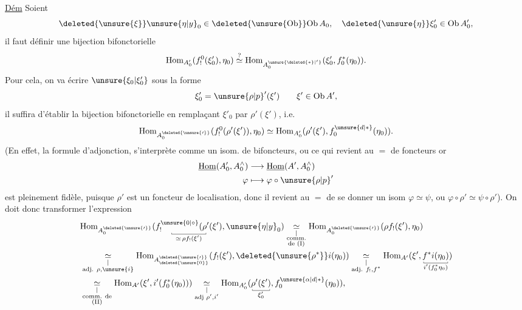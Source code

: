 \uline{Dém} Soient
\[
 \deleted{\unsure{\xi}}\unsure{\eta|y}_0\in\deleted{\unsure{\mathrm{Ob}}}\mathrm{Ob}\,A_0,\quad \deleted{\unsure{\eta}}\xi'_0\in\mathrm{Ob}\,A'_0,
\]
il faut définir une bijection bifonctorielle
\[
 \mathrm{Hom}_{A'_0}(f_!^0(\xi'_0),\eta_0)\overset{?}{\simeq}
 \mathrm{Hom}_{A^{\unsure{\deleted{*}|'}}_0}(\xi'_0,f_0^*(\eta_0)).
\]
Pour cela, on va écrire $\unsure{\xi_0|\xi'_0}$ sous la forme
\[
 \xi'_0=\unsure{\rho|p}'(\xi')\qquad \xi'\in\mathrm{Ob}\,A',
\]
il suffira d'établir la bijection bifonctorielle en remplaçant $\xi'_0$ par $\rho'(\xi')$, i.e.
\[
 \mathrm{Hom}_{A^{\deleted{\unsure{\prime}}}_0}(f_!^0(\rho'(\xi')),\eta_0)\simeq
 \mathrm{Hom}_{A'_0}(\rho'(\xi'),f_0^{\unsure{d|*}}(\eta_0)).
\]
(En effet, la formule d'adjonction, s'interprète comme un isom. de bifoncteurs, ou ce qui revient au $=$ de foncteurs
or
\[
 \begin{aligned}
 \underline{\mathrm{Hom}}(A'_0,A_0^{\wedge})&\longrightarrow\underline{\mathrm{Hom}}(A',A_0^{\wedge})\\
 \varphi&\longmapsto\varphi\circ\unsure{\rho|p}'
 \end{aligned}
\]
est pleinement fidèle, puisque $\rho'$ est un foncteur de localisation, donc il revient au $=$ de se donner un isom $\varphi\simeq\psi$, ou $\varphi\circ\rho'\simeq\psi\circ\rho'$). On doit donc transformer l'expression
\[
\begin{aligned}
 &\mathrm{Hom}_{A^{\deleted{\unsure{\prime}}}_0}(\underset{\substack{\rule{.35pt}{.4ex}\rule{4em}{.35pt}\rule{.35pt}{.4ex}\\\simeq\,\rho f_!(\xi')}}{f_!^{\unsure{0|\circ}}(\rho'(\xi')},\unsure{\eta|y}_0)
 \underset{\substack{\vert\\\text{comm.}\\\text{de (I)}}}{\simeq}\mathrm{Hom}_{A^{\deleted{\unsure{\prime}}}_0}(\rho f_!(\xi'),\eta_0)\\
 &\underset{\substack{\vert\\\text{adj. }\rho,\unsure{i}}}{\simeq}\mathrm{Hom}_{A_{\deleted{\unsure{0}}}^{\deleted{\unsure{\prime}}}}(f_!(\xi'),\deleted{\unsure{\rho^*}}i(\eta_0))
 \underset{\substack{\vert\\\text{adj. }f_!,f^*}}{\simeq}\mathrm{Hom}_{A'}(\xi',\underset{\substack{\rule{.35pt}{.4ex}\rule{2.8em}{.35pt}\rule{.35pt}{.4ex}\\i'(f_0^*\eta_0)}}{f^*i(\eta_0)})\\
 &\underset{\substack{\vert\\\text{comm. de}\\\text{(II)}}}{\simeq}\mathrm{Hom}_{A'}(\xi',i'(f_0^*(\eta_0)))
 \underset{\substack{\vert\\\text{adj }\rho',i'}}{\simeq}\mathrm{Hom}_{A'_0}(\underset{\substack{\rule{.35pt}{.4ex}\rule{2em}{.35pt}\rule{.35pt}{.4ex}\\\xi'_0}}{\rho'(\xi')},f_0^{\unsure{\alpha|d|*}}(\eta_0)),
\end{aligned}
\]
